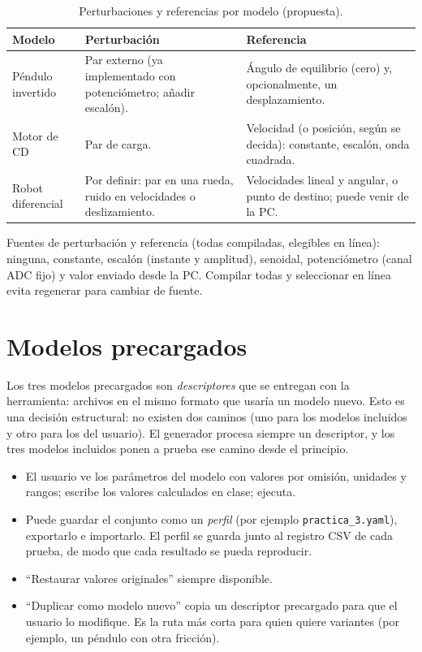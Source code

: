 \documentclass[12pt,letterpaper]{article}
\begin{document}
\begin{table}[!htbp]
\centering
\caption{Perturbaciones y referencias por modelo (propuesta).}
\label{tab:pert}
\begin{tabularx}{\textwidth}{>{\raggedright\arraybackslash}p{2.4cm}YY}
\toprule
\textbf{Modelo} & \textbf{Perturbación} & \textbf{Referencia} \\
\midrule
Péndulo invertido & Par externo (ya implementado con potenciómetro; añadir escalón). & Ángulo de equilibrio (cero) y, opcionalmente, un desplazamiento. \\
Motor de CD & Par de carga. & Velocidad (o posición, según se decida): constante, escalón, onda cuadrada. \\
Robot diferencial & Por definir: par en una rueda, ruido en velocidades o deslizamiento. & Velocidades lineal y angular, o punto de destino; puede venir de la PC. \\
\bottomrule
\end{tabularx}
\end{table}
Fuentes de perturbación y referencia (todas compiladas, elegibles en línea): ninguna, constante, escalón (instante y amplitud), senoidal, potenciómetro (canal ADC fijo) y valor enviado desde la PC. Compilar todas y seleccionar en línea evita regenerar para cambiar de fuente.

\section{Modelos precargados}

Los tres modelos precargados son \emph{descriptores} que se entregan con la herramienta: archivos en el mismo formato que usaría un modelo nuevo. Esto es una decisión estructural: no existen dos caminos (uno para los modelos incluidos y otro para los del usuario). El generador procesa siempre un descriptor, y los tres modelos incluidos ponen a prueba ese camino desde el principio.

\begin{itemize}
    \item El usuario ve los parámetros del modelo con valores por omisión, unidades y rangos; escribe los valores calculados en clase; ejecuta.
    \item Puede guardar el conjunto como un \emph{perfil} (por ejemplo \texttt{practica\_3.yaml}), exportarlo e importarlo. El perfil se guarda junto al registro CSV de cada prueba, de modo que cada resultado se pueda reproducir.
    \item ``Restaurar valores originales'' siempre disponible.
    \item ``Duplicar como modelo nuevo'' copia un descriptor precargado para que el usuario lo modifique. Es la ruta más corta para quien quiere variantes (por ejemplo, un péndulo con otra fricción).
\end{itemize}
\end{document}
